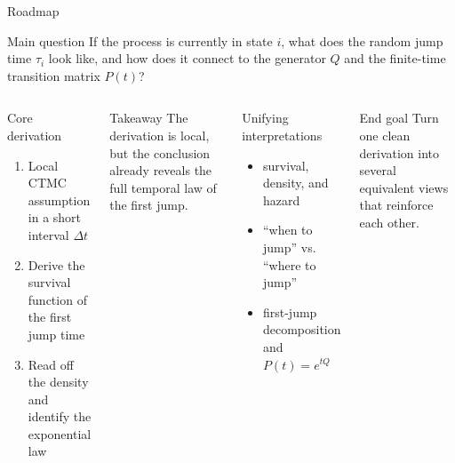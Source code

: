 \documentclass[aspectratio=169,professionalfonts]{beamer}
\begin{document}
\begin{frame}{Roadmap}
\begin{block}{Main question}
If the process is currently in state $i$, what does the random jump time $\tau_i$ look like, and how does it connect to the generator $Q$ and the finite-time transition matrix $P(t)$?
\end{block}

\vspace{0.18cm}
\begin{columns}[T,totalwidth=\textwidth]
\begin{alertblock}{Core derivation}
\begin{enumerate}
  \item Local CTMC assumption in a short interval $\Delta t$
  \item Derive the survival function of the first jump time
  \item Read off the density and identify the exponential law
\end{enumerate}
\end{alertblock}

\vspace{0.08cm}
\begin{block}{Takeaway}
The derivation is local, but the conclusion already reveals the full temporal law of the first jump.
\end{block}

\begin{block}{Unifying interpretations}
\begin{itemize}
  \item survival, density, and hazard
  \item ``when to jump'' vs. ``where to jump''
  \item first-jump decomposition and $P(t)=e^{tQ}$
\end{itemize}
\end{block}

\vspace{0.08cm}
\begin{alertblock}{End goal}
Turn one clean derivation into several equivalent views that reinforce each other.
\end{alertblock}
\end{columns}
\end{frame}
\end{document}
